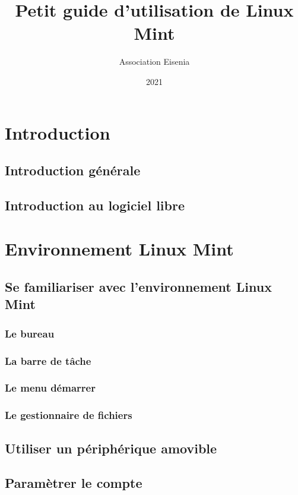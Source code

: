 \documentclass[12pt]{book}
\title{Petit guide d'utilisation de Linux Mint}
\author{Association Eisenia}
\date{2021}
\begin{document}
\maketitle

\newpage
\renewcommand{\contentsname}{Table des matières}
\tableofcontents

\newpage
\renewcommand{\chaptername}{Chapitre}
\chapter{Introduction}
	\section{Introduction générale}
	\section{Introduction au logiciel libre}

\newpage
\chapter{Environnement Linux Mint}
\section{Se familiariser avec l'environnement Linux Mint}
	\subsection{Le bureau}
	\subsection{La barre de tâche}
	\subsection{Le menu démarrer}
	\subsection{Le gestionnaire de fichiers}

\section{Utiliser un périphérique amovible}

\section{Paramètrer le compte}
\end{document}
